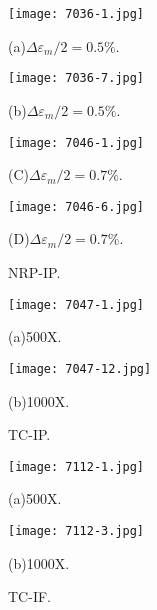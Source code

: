 \begin{figure}
  \begin{minipage}[t]{0.5\linewidth}
  \nonumber
    \centering
    \texttt{[image: 7036-1.jpg]}
    \centerline{(a)$\Delta \varepsilon_{m}/2=0.5\%$.}
  \end{minipage}%
  \begin{minipage}[t]{0.5\linewidth}
    \centering
    \texttt{[image: 7036-7.jpg]}
    \centerline{(b)$\Delta \varepsilon_{m}/2=0.5\%$.}
  \end{minipage}

  \begin{minipage}[t]{0.5\linewidth}
  \nonumber
    \centering
    \texttt{[image: 7046-1.jpg]}
    \centerline{(C)$\Delta \varepsilon_{m}/2=0.7\%$.}
  \end{minipage}%
  \begin{minipage}[t]{0.5\linewidth}
    \centering
    \texttt{[image: 7046-6.jpg]}
    \centerline{(D)$\Delta \varepsilon_{m}/2=0.7\%$.}
  \end{minipage}

  \caption{NRP-IP.}
  \label{Fig:MicrostructureofInconel718}
\end{figure}

\begin{figure}
  \begin{minipage}[t]{0.5\linewidth}
  \nonumber
    \centering
    \texttt{[image: 7047-1.jpg]}
    \centerline{(a)500X.}
  \end{minipage}%
  \begin{minipage}[t]{0.5\linewidth}
    \centering
    \texttt{[image: 7047-12.jpg]}
    \centerline{(b)1000X.}
  \end{minipage}
  \caption{TC-IP.}
  \label{Fig:MicrostructureofInconel718}
\end{figure}

\begin{figure}
  \begin{minipage}[t]{0.5\linewidth}
  \nonumber
    \centering
    \texttt{[image: 7112-1.jpg]}
    \centerline{(a)500X.}
  \end{minipage}%
  \begin{minipage}[t]{0.5\linewidth}
    \centering
    \texttt{[image: 7112-3.jpg]}
    \centerline{(b)1000X.}
  \end{minipage}
  \caption{TC-IF.}
  \label{Fig:MicrostructureofInconel718}
\end{figure}

